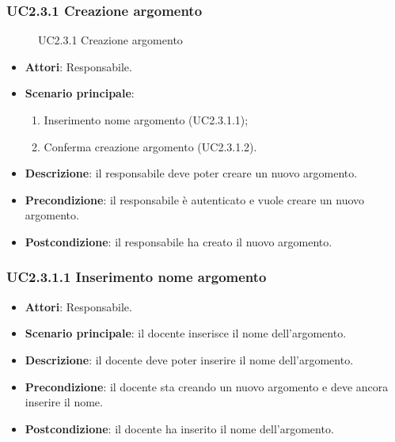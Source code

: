 \subsubsection{UC2.3.1 Creazione argomento}
\begin{figure}[H]
\centering
\noindent{}
\caption{UC2.3.1 Creazione argomento}
\end{figure}
\begin{itemize}
\item \textbf{Attori}: Responsabile.
\item \textbf{Scenario principale}:
\begin{enumerate}
\item Inserimento nome argomento (UC2.3.1.1);
\item Conferma creazione argomento (UC2.3.1.2).
\end{enumerate}
\item \textbf{Descrizione}: il responsabile deve poter creare un nuovo argomento.
\item \textbf{Precondizione}: il responsabile è autenticato e vuole creare un nuovo argomento.
\item \textbf{Postcondizione}: il responsabile ha creato il nuovo argomento.
\end{itemize}
\subsubsection{UC2.3.1.1 Inserimento nome argomento}
\begin{itemize}
\item \textbf{Attori}: Responsabile.
\item \textbf{Scenario principale}: il docente inserisce il nome dell'argomento.
\item \textbf{Descrizione}: il docente deve poter inserire il nome dell'argomento.
\item \textbf{Precondizione}: il docente sta creando un nuovo argomento e deve ancora inserire il nome.
\item \textbf{Postcondizione}: il docente ha inserito il nome dell'argomento.
\end{itemize}
